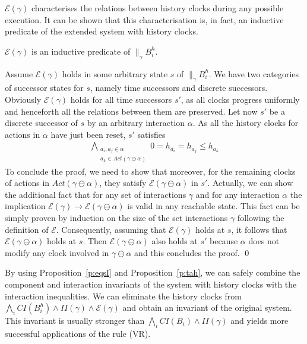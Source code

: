 \documentclass{LMCS}
\newcommand{\actions}{\mathit{Act}}
\newcommand{\eqs}{\mathcal{E}}
\newcommand{\cn}{\mathit{B}\xspace}
\newcommand{\ic}{\mathit{CI}}
\newcommand{\iim}{\mathit{II}}
\theoremstyle{plain}\newtheorem{remark}[thm]{Remark}
\theoremstyle{plain}\newtheorem{example}[thm]{Example}
\begin{document}
\noindent $\eqs(\gamma)$ characterises the relations between history clocks during
any possible execution. It can be shown that this characterisation is, in
fact, an inductive predicate of the extended system with history clocks.

\begin{prop}
\label{p:eqsI}
$\eqs(\gamma)$ is an inductive predicate of $\|_{\gamma} \cn^h_i$.
\end{prop}
\proof Assume $\eqs(\gamma)$ holds in some arbitrary state $s$ of
$\|_{\gamma} \cn^h_i$. We have two categories of successor states for
$s$, namely time successors and discrete successors. Obviously
$\eqs(\gamma)$ holds for all time successors $s'$, as all clocks
progress uniformly and henceforth all the relations between them are
preserved.  Let now $s'$ be a discrete successor of $s$ by an
arbitrary interaction $\alpha$.  As all the history clocks for actions
in $\alpha$ have just been reset, $s'$ satisfies
\begin{align}
\bigwedge_{\substack{a_i, a_j \in \alpha \\ a_k
    \in \actions(\gamma \ominus \alpha)}} 0 = h_{a_i} = h_{a_j} \leq
h_{a_k} \label{eq:si1}
\end{align} To conclude the proof, we need to show that moreover, for
the remaining clocks of actions in $\actions(\gamma \ominus \alpha)$,
they satisfy $\eqs(\gamma \ominus \alpha)$ in $s'$.  Actually, we can
show the additional fact that for any set of interactions $\gamma$ and
for any interaction $\alpha$ the implication $\eqs(\gamma) \rightarrow
\eqs(\gamma \ominus \alpha)$ is valid in any reachable state. This
fact can be simply proven by induction on the size of the set
interactions $\gamma$ following the definition of
$\eqs$. Consequently, assuming that $\eqs(\gamma)$ holds at $s$, it
follows that $\eqs(\gamma\ominus\alpha)$ holds at $s$. Then
$\eqs(\gamma\ominus\alpha)$ also holds at $s'$ because $\alpha$ does
not modify any clock involved in $\gamma \ominus \alpha$ and this
concludes the proof.  \qed

By using Proposition~\ref{p:eqsI} and Proposition~\ref{p:tah}, we can
safely combine the component and interaction invariants of the system with
history clocks with the interaction inequalities.  We can eliminate the
history clocks from $\bigwedge_i \ic(\cn_i^h) \wedge \iim(\gamma) \wedge
\eqs(\gamma)$ and obtain an invariant of the original system. This
invariant is usually stronger than $\bigwedge_i \ic(\cn_i) \wedge
\iim(\gamma)$ and yields more successful applications of the rule (VR).
\end{document}
